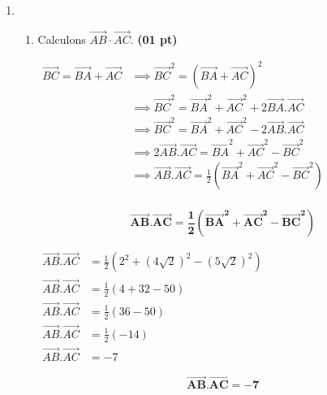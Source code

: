 \documentclass[12pt,a4paper]{article}
\begin{document}
\begin{enumerate}
    \item 
    \begin{enumerate}
        \item Calculons \( \overrightarrow{AB} \cdot \overrightarrow{AC} \). \hfill \textbf{(01 pt)}
        
        \( 
        \begin{aligned}  
        \overrightarrow{BC}=\overrightarrow{BA}+\overrightarrow{AC} &\implies \overrightarrow{BC}^{2}=(\overrightarrow{BA}+\overrightarrow{AC})^{2}\\
        &\implies \overrightarrow{BC}^{2}=\overrightarrow{BA}^{2}+\overrightarrow{AC}^{2}+2\overrightarrow{BA}.\overrightarrow{AC}\\
        &\implies \overrightarrow{BC}^{2}=\overrightarrow{BA}^{2}+\overrightarrow{AC}^{2}-2\overrightarrow{AB}.\overrightarrow{AC}\\
        &\implies 2\overrightarrow{AB}.\overrightarrow{AC}=\overrightarrow{BA}^{2}+\overrightarrow{AC}^{2}-\overrightarrow{BC}^{2}\\
        &\implies \overrightarrow{AB}.\overrightarrow{AC}=\frac{1}{2}\left( \overrightarrow{BA}^{2}+\overrightarrow{AC}^{2}-\overrightarrow{BC}^{2}\right) \\
        \end{aligned}
        \)

\begin{resultbox}
    \[
    \mathbf{\overrightarrow{AB}.\overrightarrow{AC}=\frac{1}{2}\left( \overrightarrow{BA}^{2}+\overrightarrow{AC}^{2}-\overrightarrow{BC}^{2}\right)}
    \]
\end{resultbox}        
        
        \( 
        \begin{aligned}    
       \overrightarrow{AB}.\overrightarrow{AC}&=\frac{1}{2}\left( 2^{2}+(4\sqrt{2})^{2}-(5\sqrt{2})^{2}\right) \\
       \overrightarrow{AB}.\overrightarrow{AC}&=\frac{1}{2}\left( 4+32-50\right)\\
       \overrightarrow{AB}.\overrightarrow{AC}&=\frac{1}{2}\left( 36-50\right)\\
       \overrightarrow{AB}.\overrightarrow{AC}&=\frac{1}{2}\left( -14\right)\\
       \overrightarrow{AB}.\overrightarrow{AC}&=-7
        \end{aligned}
        \)
        
\begin{resultbox}
    \[
    \mathbf{\overrightarrow{AB}.\overrightarrow{AC}=-7}
    \]
\end{resultbox} 


\end{enumerate}
\end{enumerate}
\end{document}
